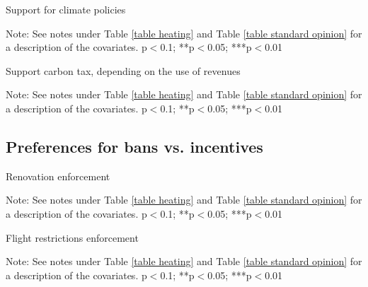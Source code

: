 \documentclass{article}
\begin{document}
\begin{table}[h!]
	\caption{Support for climate policies}
	\begin{center}
		\scalebox{0.7}{}
	\end{center}
	{\footnotesize Note: See notes under Table \ref{table heating} and Table \ref{table standard opinion} for a description of the covariates.
	\newline *p$<$0.1; **p$<$0.05; ***p$<$0.01}
\end{table}	

\begin{landscape}
	\begin{table}[h!]
	\caption{Support carbon tax, depending on the use of revenues}
	\begin{center}
		\scalebox{0.6}{}
	\end{center}
	{\footnotesize Note: See notes under Table \ref{table heating} and Table \ref{table standard opinion} for a description of the covariates.
	\newline *p$<$0.1; **p$<$0.05; ***p$<$0.01}
\end{table}	
\end{landscape}

\clearpage
\subsection{Preferences for bans vs. incentives}

\begin{table}[h!]
	\caption{Renovation enforcement}
	\begin{center}
		\scalebox{0.7}{}
	\end{center}
	{\footnotesize Note: See notes under Table \ref{table heating} and Table \ref{table standard opinion} for a description of the covariates.
	\newline *p$<$0.1; **p$<$0.05; ***p$<$0.01}
\end{table}	

\begin{landscape}
	\begin{table}[h!]
	\caption{Flight restrictions enforcement}
	\begin{center}
		\scalebox{0.6}{}
	\end{center}
	{\footnotesize Note: See notes under Table \ref{table heating} and Table \ref{table standard opinion} for a description of the covariates.
	\newline *p$<$0.1; **p$<$0.05; ***p$<$0.01}
\end{table}	
\end{landscape}
\end{document}
